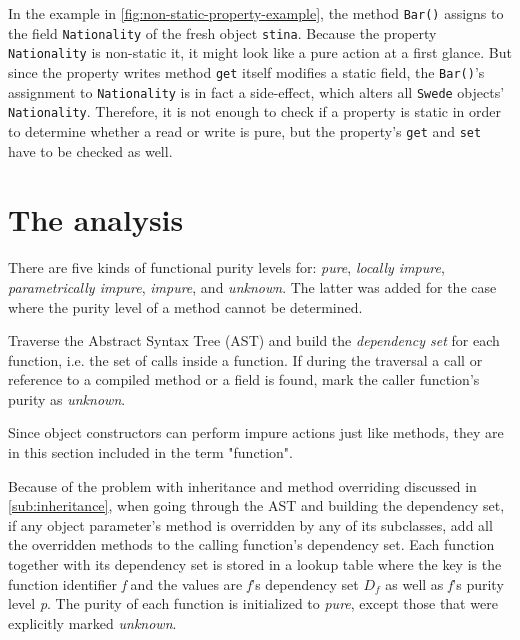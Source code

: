 \documentclass[a4paper,12pt]{article}
\begin{document}
In the example in \autoref{fig:non-static-property-example}, the method \texttt{Bar()} assigns to the field \texttt{Nationality} of the fresh object \texttt{stina}. Because the property \texttt{Nationality} is non-static it, it might look like a pure action at a first glance. But since the property writes method \texttt{get} itself modifies a static field, the \texttt{Bar()}'s assignment to \texttt{Nationality} is in fact a side-effect, which alters all \texttt{Swede} objects' \texttt{Nationality}. Therefore, it is not enough to check if a property is static in order to determine whether a read or write is pure, but the property's \texttt{get} and \texttt{set} have to be checked as well.


\section{The analysis} \label{sec:Analysis}
There are five kinds of functional purity levels for: \textit{pure}, \textit{locally impure}, \textit{parametrically impure}, \textit{impure}, and \textit{unknown}. The latter was added for the case where the purity level of a method cannot be determined.

Traverse the Abstract Syntax Tree (AST) and build the \textit{dependency set} for each function, i.e. the set of calls inside a function. If during the traversal a call or reference to a compiled method or a field is found, mark the caller function's purity as \textit{unknown}.

Since object constructors can perform impure actions just like methods, they are in this section included in the term "function".

Because of the problem with inheritance and method overriding discussed in \autoref{sub:inheritance}, when going through the AST and building the dependency set, if any object parameter's method is overridden by any of its subclasses, add all the overridden methods to the calling function's dependency set. Each function together with its dependency set is stored in a lookup table where the key is the function identifier \textit{f} and the values are \textit{f}'s dependency set $D_f$ as well as \textit{f}'s purity level \textit{p}. The purity of each function is initialized to \textit{pure}, except those that were explicitly marked \textit{unknown}.
\end{document}
